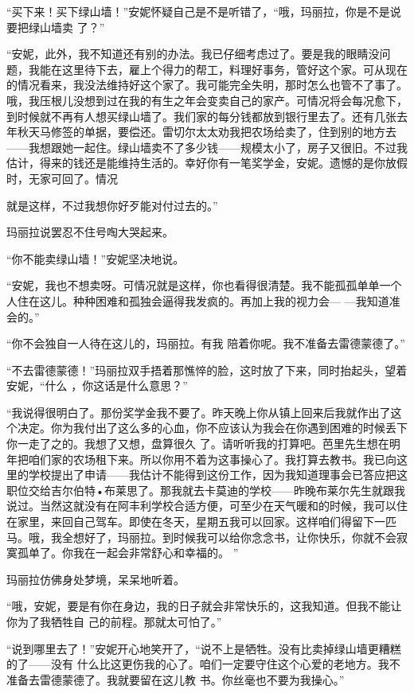 \documentclass{article}
\begin{document}
“买下来！买下绿山墙！”安妮怀疑自己是不是听错了，“哦，玛丽拉，你是不是说要把绿山墙卖
了？” 

“安妮，此外，我不知道还有别的办法。我已仔细考虑过了。要是我的眼睛没问题，我能在这里待下去，雇上个得力的帮工，料理好事务，管好这个家。可从现在的情况看来，我没法维持好这个家了。我可能完全失明，那时怎么也管不了事了。哦，我压根儿没想到过在我的有生之年会变卖自己的家产。可情况将会每况愈下，到时候就不再有人想买绿山墙了。我们家的每分钱都放到银行里去了。还有几张去年秋天马修签的单据，要偿还。雷切尔太太劝我把农场给卖了，住到别的地方去——我想跟她一起住。绿山墙卖不了多少钱——规模太小了，房子又很旧。不过我估计，得来的钱还是能维持生活的。幸好你有一笔奖学金，安妮。遗憾的是你放假时，无家可回了。情况

\newpage
就是这样，不过我想你好歹能对付过去的。” 


玛丽拉说罢忍不住号啕大哭起来。 


“你不能卖绿山墙！”安妮坚决地说。 

“安妮，我也不想卖呀。可情况就是这样，你也看得很清楚。我不能孤孤单单一个人住在这儿。种种困难和孤独会逼得我发疯的。再加上我的视力会—
—我知道准会的。” 

“你不会独自一人待在这儿的，玛丽拉。有我
陪着你呢。我不准备去雷德蒙德了。” 

“不去雷德蒙德！”玛丽拉双手捂着那憔悴的脸，这时放了下来，同时抬起头，望着安妮，“什么
，你这话是什么意思？” 

“我说得很明白了。那份奖学金我不要了。昨天晚上你从镇上回来后我就作出了这个决定。你为我付出了这么多的心血，你不应该认为我会在你遇到困难的时候丢下你一走了之的。我想了又想，盘算很久
\newpage
了。请听听我的打算吧。芭里先生想在明年把咱们家的农场租下来。所以你用不着为这事操心了。我打算去教书。我已向这里的学校提出了申请——我估计不能得到这份工作，因为我知道理事会已答应把这职位交给吉尔伯特•布莱思了。那我就去卡莫迪的学校——昨晚布莱尔先生就跟我说过。当然这就没有在阿丰利学校合适方便，可至少在天气暖和的时候，我可以住在家里，来回自己驾车。即使在冬天，星期五我可以回家。这样咱们得留下一匹马。哦，我全想好了，玛丽拉。到时候我可以给你念念书，让你快乐，你就不会寂寞孤单了。你我在一起会非常舒心和幸福的。
” 


玛丽拉仿佛身处梦境，呆呆地听着。 

“哦，安妮，要是有你在身边，我的日子就会非常快乐的，这我知道。但我不能让你为了我牺牲自
己的前程。那就太可怕了。” 

“说到哪里去了！”安妮开心地笑开了，“说不上是牺牲。没有比卖掉绿山墙更糟糕的了——没有
\newpage
什么比这更伤我的心了。咱们一定要守住这个心爱的老地方。我不准备去雷德蒙德了。我就要留在这儿教
书。你丝毫也不要为我操心。” 
\end{document}
